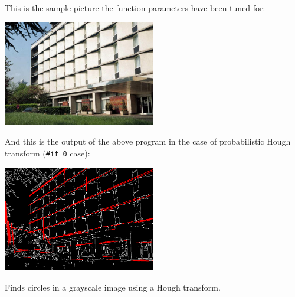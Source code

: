 This is the sample picture the function parameters have been tuned for:

\includegraphics[width=0.5\textwidth]{pics/building.jpg}

And this is the output of the above program in the case of probabilistic Hough transform (\texttt{\#if 0} case):

\includegraphics[width=0.5\textwidth]{pics/houghp.png}

\label{HoughCircles}

Finds circles in a grayscale image using a Hough transform.


